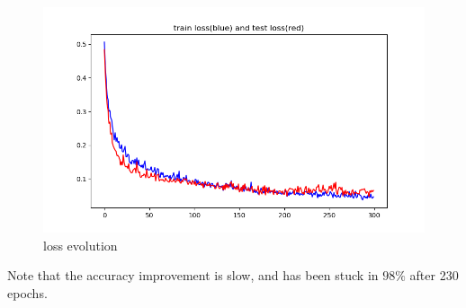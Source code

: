 \documentclass[a4paper,12pt]{article}
\begin{document}
\begin{figure}[htbp]
    \centering
    \includegraphics[width = \textwidth]{loss52}
    \caption{loss evolution}
    \label{loss52}
\end{figure}
Note that the accuracy improvement is slow, and has been stuck in $98\%$ after 230 epochs.
\end{document}
